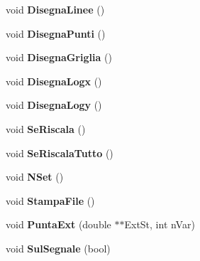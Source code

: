 \begin{DoxyCompactItemize}
\item 
void {\bfseries Disegna\+Linee} ()\hypertarget{classElementiGrafici_aaf4729e6eaa6920c691fbde7d0a74279}{}\label{classElementiGrafici_aaf4729e6eaa6920c691fbde7d0a74279}

\item 
void {\bfseries Disegna\+Punti} ()\hypertarget{classElementiGrafici_a88ba06b0806d1508d706a4720cf95576}{}\label{classElementiGrafici_a88ba06b0806d1508d706a4720cf95576}

\item 
void {\bfseries Disegna\+Griglia} ()\hypertarget{classElementiGrafici_a432112ec4a583449f221ffcca2881627}{}\label{classElementiGrafici_a432112ec4a583449f221ffcca2881627}

\item 
void {\bfseries Disegna\+Logx} ()\hypertarget{classElementiGrafici_a9e45f519a13281c3ff0d3df0e305428f}{}\label{classElementiGrafici_a9e45f519a13281c3ff0d3df0e305428f}

\item 
void {\bfseries Disegna\+Logy} ()\hypertarget{classElementiGrafici_a3f42d94c22f6258ef28279c384d6cadc}{}\label{classElementiGrafici_a3f42d94c22f6258ef28279c384d6cadc}

\item 
void {\bfseries Se\+Riscala} ()\hypertarget{classElementiGrafici_ad02893236e5b30858927f97156b79280}{}\label{classElementiGrafici_ad02893236e5b30858927f97156b79280}

\item 
void {\bfseries Se\+Riscala\+Tutto} ()\hypertarget{classElementiGrafici_a51720bc39995d8710fb9f24bf57dc922}{}\label{classElementiGrafici_a51720bc39995d8710fb9f24bf57dc922}

\item 
void {\bfseries N\+Set} ()\hypertarget{classElementiGrafici_a58725b35c5fb4d5833b4bee464ae2011}{}\label{classElementiGrafici_a58725b35c5fb4d5833b4bee464ae2011}

\item 
void {\bfseries Stampa\+File} ()\hypertarget{classElementiGrafici_a73e375f008c0d0ea1dafc4f215f217e0}{}\label{classElementiGrafici_a73e375f008c0d0ea1dafc4f215f217e0}

\item 
void {\bfseries Punta\+Ext} (double $\ast$$\ast$Ext\+St, int n\+Var)\hypertarget{classElementiGrafici_a6dfbf3d00f9a30e895519026e5a524fc}{}\label{classElementiGrafici_a6dfbf3d00f9a30e895519026e5a524fc}

\item 
void {\bfseries Sul\+Segnale} (bool)\hypertarget{classElementiGrafici_aab89c647fd8087701ae2bd5649ac0e71}{}\label{classElementiGrafici_aab89c647fd8087701ae2bd5649ac0e71}


\end{DoxyCompactItemize}
